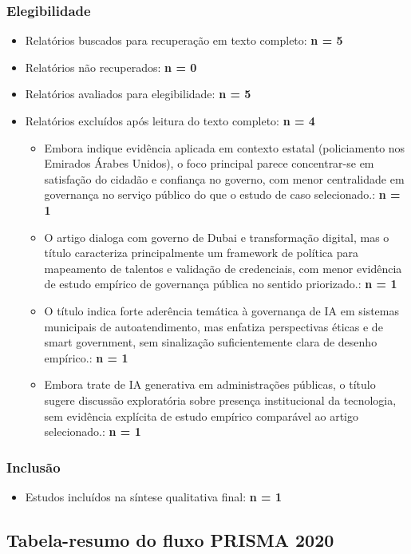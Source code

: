 \documentclass[12pt,a4paper]{article}
\begin{document}
\subsubsection{Elegibilidade}
\label{sec:orge1c6dd2}
\begin{itemize}
\item Relatórios buscados para recuperação em texto completo: \textbf{n = 5}
\item Relatórios não recuperados: \textbf{n = 0}
\item Relatórios avaliados para elegibilidade: \textbf{n = 5}
\item Relatórios excluídos após leitura do texto completo: \textbf{n = 4}
\begin{itemize}
\item Embora indique evidência aplicada em contexto estatal (policiamento nos Emirados Árabes Unidos), o foco principal parece concentrar-se em satisfação do cidadão e confiança no governo, com menor centralidade em governança no serviço público do que o estudo de caso selecionado.: \textbf{n = 1}
\item O artigo dialoga com governo de Dubai e transformação digital, mas o título caracteriza principalmente um framework de política para mapeamento de talentos e validação de credenciais, com menor evidência de estudo empírico de governança pública no sentido priorizado.: \textbf{n = 1}
\item O título indica forte aderência temática à governança de IA em sistemas municipais de autoatendimento, mas enfatiza perspectivas éticas e de smart government, sem sinalização suficientemente clara de desenho empírico.: \textbf{n = 1}
\item Embora trate de IA generativa em administrações públicas, o título sugere discussão exploratória sobre presença institucional da tecnologia, sem evidência explícita de estudo empírico comparável ao artigo selecionado.: \textbf{n = 1}
\end{itemize}
\end{itemize}

\subsubsection{Inclusão}
\label{sec:org31f176e}
\begin{itemize}
\item Estudos incluídos na síntese qualitativa final: \textbf{n = 1}
\end{itemize}

\subsection{Tabela-resumo do fluxo PRISMA 2020}
\label{sec:org6714b03}
\end{document}
